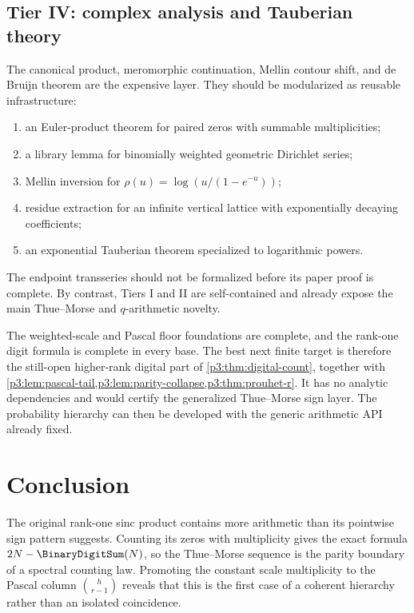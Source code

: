 \documentclass[11pt,oneside]{article}
\theoremstyle{definition}
\theoremstyle{remark}
\begin{document}
\subsection{Tier IV: complex analysis and Tauberian theory}

The canonical product, meromorphic continuation, Mellin contour shift, and de Bruijn theorem are the expensive layer.  They should be modularized as reusable infrastructure:
\begin{enumerate}[label=\textbf{IV.\arabic*}]
\item an Euler-product theorem for paired zeros with summable multiplicities;
\item a library lemma for binomially weighted geometric Dirichlet series;
\item Mellin inversion for $\rho(u)=\log(u/(1-e^{-u}))$;
\item residue extraction for an infinite vertical lattice with exponentially decaying coefficients;
\item an exponential Tauberian theorem specialized to logarithmic powers.
\end{enumerate}
The endpoint transseries should not be formalized before its paper proof is complete.  By contrast, Tiers I and II are self-contained and already expose the main Thue--Morse and $q$-arithmetic novelty.

\begin{statusbox}
The weighted-scale and Pascal floor foundations are complete, and the rank-one
digit formula is complete in every base.  The best next finite target is
therefore the still-open higher-rank digital part of
\cref{p3:thm:digital-count}, together with
\cref{p3:lem:pascal-tail,p3:lem:parity-collapse,p3:thm:prouhet-r}.  It has no analytic
dependencies and would certify the generalized Thue--Morse sign layer.  The
probability hierarchy can then be developed with the generic arithmetic API
already fixed.
\end{statusbox}

\section{Conclusion}\label{p3:sec:conclusion}

The original rank-one sinc product contains more arithmetic than its pointwise sign pattern suggests.  Counting its zeros with multiplicity gives the exact formula $2N-\BinaryDigitSum(N)$, so the Thue--Morse sequence is the parity boundary of a spectral counting law.  Promoting the constant scale multiplicity to the Pascal column $\binom h{r-1}$ reveals that this is the first case of a coherent hierarchy rather than an isolated coincidence.
\end{document}

